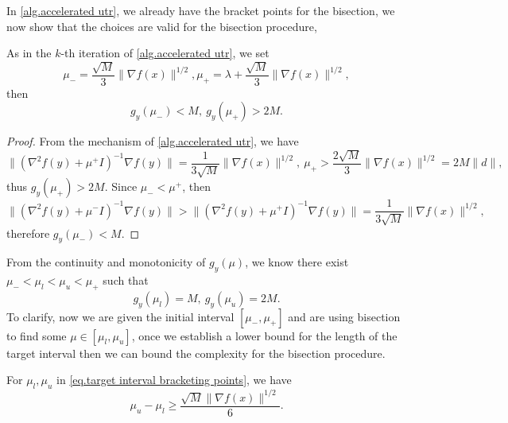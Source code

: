 \documentclass{article}
\begin{document}
In \autoref{alg.accelerated utr}, we already have the bracket points for the bisection, we now show that the choices are valid for the bisection procedure,
\begin{lemma}
    \label{eq.valid bracketing}
    As in the $k$-th iteration of \autoref{alg.accelerated utr}, we set
    \begin{equation*}
    \mu_- = \frac{\sqrt{M}}{3}\|\nabla f(x)\|^{1/2}, \mu_+ = \lambda+\frac{\sqrt{M}}{3}\|\nabla f(x)\|^{1/2},
    \end{equation*}
    then 
    \begin{equation*}
        g_y(\mu_-) < M, \ g_y(\mu_+) >2M.
    \end{equation*}
\end{lemma}
\begin{proof}
    From the mechanism of \autoref{alg.accelerated utr}, we have 
    \begin{equation*}
        \| \left (\nabla ^2 f(y)+\mu^+ I\right )^{-1} \nabla f(y)\| = \frac{1}{3\sqrt{M}}\|\nabla f(x)\|^{1/2}, \ \mu_+ >\frac{2\sqrt{M}}{3}\|\nabla f(x)\|^{1/2}=2M\|d\|,
    \end{equation*}
    thus $g_y(\mu_+) >2M$. Since $\mu_- <\mu^+$, then
    \begin{equation*}
        \| \left (\nabla ^2 f(y)+\mu^- I\right )^{-1} \nabla f(y)\|>\| \left (\nabla ^2 f(y)+\mu^+ I\right )^{-1} \nabla f(y)\| = \frac{1}{3\sqrt{M}}\|\nabla f(x)\|^{1/2},
    \end{equation*}
    therefore $g_y(\mu_-)< M$.
\end{proof}
From the continuity and monotonicity of $g_y(\mu)$, we know there exist $\mu_-<\mu_l<\mu_u<\mu_+$ such that
\begin{equation}\label{eq.target interval bracketing points}
    g_{y}(\mu_l)=M, \ g_{y}(\mu_u)=2M.
\end{equation}
To clarify, now we are given the initial interval $[\mu_-,\mu_+]$ and are using bisection to find some $\mu\in[\mu_l,\mu_u]$, once we establish a lower bound for the length of the target interval then we can bound the complexity for the bisection procedure.
\begin{lemma}
    \label{lem.bound target interval}
    For $\mu_l,\mu_u$ in \eqref{eq.target interval bracketing points}, we have
    \begin{equation}
        \label{eq.bound target interval}
        \mu_u-\mu_l \geq \frac{\sqrt{M}\|\nabla f(x)\|^{1/2}}{6}.
    \end{equation}
\end{lemma}
\end{document}
